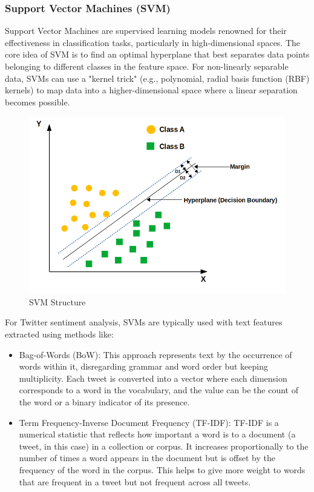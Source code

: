 \subsubsection{Support Vector Machines (SVM)}
Support Vector Machines are supervised learning models renowned for their effectiveness in classification tasks, particularly in high-dimensional spaces. The core idea of SVM is to find an optimal hyperplane that best separates data points belonging to different classes in the feature space. For non-linearly separable data, SVMs can use a "kernel trick" (e.g., polynomial, radial basis function (RBF) kernels) to map data into a higher-dimensional space where a linear separation becomes possible.

\begin{figure} [h!]
    \centering
    \includegraphics[width=0.75\linewidth]{images/svm_arch.png}
    \caption{SVM Structure}
    \label{fig:enter-label}
\end{figure}

For Twitter sentiment analysis, SVMs are typically used with text features extracted using methods like:

\begin{itemize}
    \item Bag-of-Words (BoW): This approach represents text by the occurrence of words within it, disregarding grammar and word order but keeping multiplicity. Each tweet is converted into a vector where each dimension corresponds to a word in the vocabulary, and the value can be the count of the word or a binary indicator of its presence.
    \item Term Frequency-Inverse Document Frequency (TF-IDF): TF-IDF is a numerical statistic that reflects how important a word is to a document (a tweet, in this case) in a collection or corpus. It increases proportionally to the number of times a word appears in the document but is offset by the frequency of the word in the corpus. This helps to give more weight to words that are frequent in a tweet but not frequent across all tweets.
\end{itemize}

